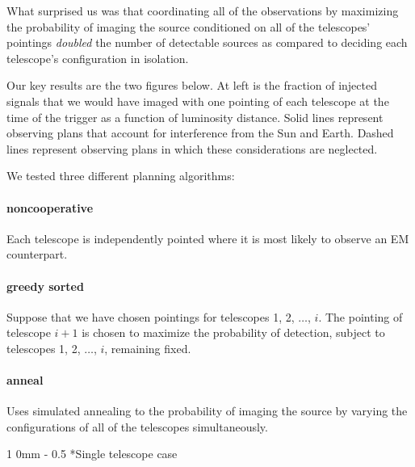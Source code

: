 \documentclass[portrait]{a0poster}
\makeatletter
\renewcommand{\section}{\@startsection
{section}%
{1}%
{0mm}%
{-\baselineskip}%
{0.5\baselineskip}%
{\fontspec{Marvel Bold}\Huge}} %
\makeatother
\begin{document}
What surprised us was that coordinating all of the observations by maximizing the probability of imaging the source conditioned on all of the telescopes’ pointings \emph{doubled} the number of detectable sources as compared to deciding each telescope’s configuration in isolation.

\framebreak

Our key results are the two figures below.  At left is the fraction of injected signals that we would have imaged with one pointing of each telescope at the time of the trigger as a function of luminosity distance.  Solid lines represent observing plans that account for interference from the Sun and Earth.  Dashed lines represent observing plans in which these considerations are neglected.

We tested three different planning algorithms:

\paragraph{\color{red}noncooperative}
Each telescope is independently pointed where it is most likely to observe an EM counterpart.

\paragraph{\color{green!50!black}greedy sorted}
Suppose that we have chosen pointings for telescopes 1, 2, $\dots$, $i$.  The pointing of telescope $i+1$ is chosen to maximize the probability of detection, subject to telescopes 1, 2, $\dots$, $i$, remaining fixed.

\paragraph{\color{blue}anneal}
Uses simulated annealing to the probability of imaging the source by varying the configurations of all of the telescopes simultaneously.

\framebreak

\section*{Single telescope case}
\end{document}
